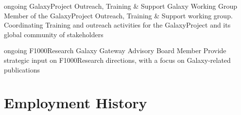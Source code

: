 \documentclass[]{shiltemann-cv}
\begin{document}
\begin{entrylist}
\entry
  {ongoing}
  {GalaxyProject Outreach, Training \& Support}
  {Galaxy Working Group}
  {Member of the GalaxyProject Outreach, Training \& Support working group. Coordinating Training and outreach activities for the GalaxyProject and its global community of stakeholders}
\end{entrylist}

\begin{entrylist}
\entry
  {ongoing}
  {F1000Research Galaxy Gateway}
  {Advisory Board Member}
  {Provide strategic input on F1000Research directions, with a focus on Galaxy-related publications}
  {}
\end{entrylist}

\section{Employment History}
\end{document}
